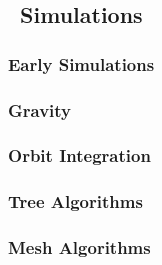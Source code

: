 \subsection{\nbody\ Simulations}
\label{subsec:nbody_simulations}



\subsubsection{Early Simulations}
\label{subsubsec:early_simulations}



\subsubsection{Gravity}
\label{subsubsec:gravity}



\subsubsection{Orbit Integration}
\label{subsubsec:orbit_integration}



\subsubsection{Tree Algorithms}
\label{subsubsec:tree_algorithms}



\subsubsection{Mesh Algorithms}
\label{subsubsec:mesh_algorithms}




